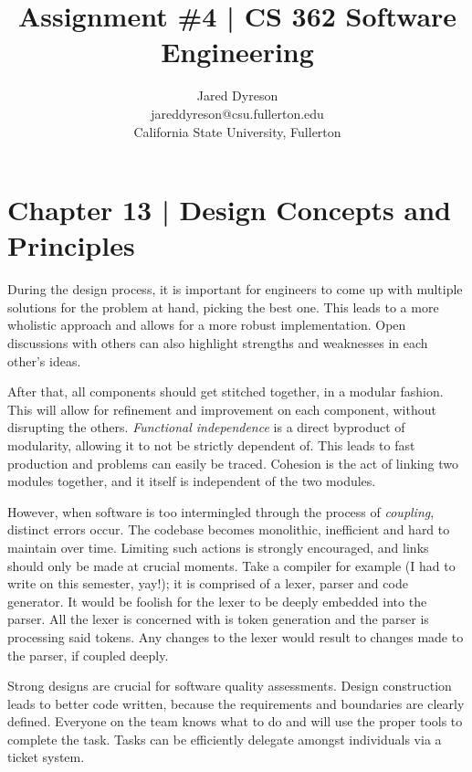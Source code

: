 \documentclass{article}
\title{Assignment \#4 | CS 362 Software Engineering}
\author{Jared Dyreson \\
        jareddyreson@csu.fullerton.edu \\
        California State University, Fullerton}
\date
\begin{document}
\maketitle
\tableofcontents

\newpage

\section{Chapter 13 | Design Concepts and Principles}

During the design process, it is important for engineers to come up with multiple solutions for the problem at hand, picking the best one.
This leads to a more wholistic approach and allows for a more robust implementation.
Open discussions with others can also highlight strengths and weaknesses in each other's ideas.


After that, all components should get stitched together, in a modular fashion.
This will allow for refinement and improvement on each component, without disrupting the others.
\emph{Functional independence} is a direct byproduct of modularity, allowing it to not be strictly dependent of.
This leads to fast production and problems can easily be traced.
Cohesion is the act of linking two modules together, and it itself is independent of the two modules.

However, when software is too intermingled through the process of \emph{coupling}, distinct errors occur.
The codebase becomes monolithic, inefficient and hard to maintain over time.
Limiting such actions is strongly encouraged, and links should only be made at crucial moments.
Take a compiler for example (I had to write on this semester, yay!); it is comprised of a lexer, parser and code generator.
It would be foolish for the lexer to be deeply embedded into the parser.
All the lexer is concerned with is token generation and the parser is processing said tokens.
Any changes to the lexer would result to changes made to the parser, if coupled deeply.

Strong designs are crucial for software quality assessments.
Design construction leads to better code written, because the requirements and boundaries are clearly defined.
Everyone on the team knows what to do and will use the proper tools to complete the task.
Tasks can be efficiently delegate amongst individuals via a ticket system.
\end{document}
